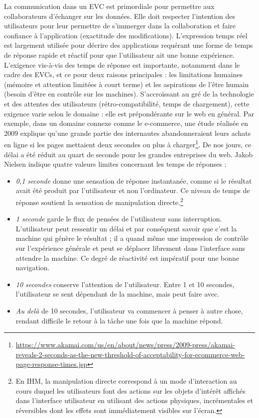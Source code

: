 La communication dans un \gls{EVC} est primordiale pour permettre aux collaborateurs d'échanger sur les données. 
Elle doit respecter l'intention des utilisateurs pour leur permettre de s'immerger dans la collaboration et faire confiance à l'application (exactitude des modifications).
L'expression temps réel est largement utilisée pour décrire des applications requérant une 
forme de temps de réponse rapide et réactif pour que l'utilisateur ait une bonne 
expérience. 
L'exigence vis-à-vis des temps de réponse est  
importante, notamment dans le cadre des \glspl{EVC}, et ce pour deux raisons principales : les limitations humaines (mémoire et 
attention limitées à court terme) et les aspirations de l'être humain (besoin d'être en contrôle sur les 
machines). S'accroissant au gré de la technologie et des attentes des 
utilisateurs (rétro-compatibilité, temps de 
chargement), cette exigence varie selon le domaine : elle est prépondérante sur le 
web en général. 
Par exemple, dans un domaine connexe comme le e-commerce, une étude réalisée 
en 2009 explique qu’une grande partie des internautes abandonneraient leurs achats 
en ligne si les pages mettaient deux secondes ou plus à charger\footnote{\url{https://www.akamai.com/us/en/about/news/press/2009-press/akamai-reveals-2-seconds-as-the-new-threshold-of-acceptability-for-ecommerce-web-page-response-times.jsp}}. De nos jours, ce 
délai a été réduit au quart de seconde pour les grandes entreprises du web. Jakob 
Nielsen \cite{Nielsen1993a} indique quatre valeurs limites concernant les 
temps de réponses :
\begin{itemize}
	\item \textit{0,1 seconde} donne une sensation de réponse instantanée, comme 
	si le 
	résultat avait été produit par l'utilisateur et non l'ordinateur. Ce niveau de temps 
	de réponse soutient la sensation de manipulation directe.\footnote{En IHM, la 
		manipulation directe correspond à un mode d'interaction au cours duquel les 
		utilisateurs font des actions sur les objets d'intérêt affichés dans l'interface 
		utilisateur en utilisant des actions physiques, incrémentales et réversibles 
		dont 
		les effets sont immédiatement visibles sur l'écran.} 
	\item \textit{1 seconde} garde le flux de pensées de l'utilisateur sans 
	interruption. 
	L'utilisateur peut ressentir un délai et par conséquent savoir que c'est la 
	machine qui génère le résultat ; il a quand même une impression de 
	contrôle sur l'expérience générale et peut se déplacer librement dans l'interface 
	sans attendre la machine. Ce degré de réactivité est impératif pour une bonne 
	navigation.
	\item \textit{10 secondes} conserve l'attention de l'utilisateur. Entre 1 et 10 
	secondes, l'utilisateur se sent dépendant de la machine, mais peut faire avec. 
	\item \textit{Au delà} de 10 secondes, l'utilisateur va commencer à penser à autre chose, rendant difficile 
	le retour à la tâche une fois que la machine répond.
\end{itemize} 

